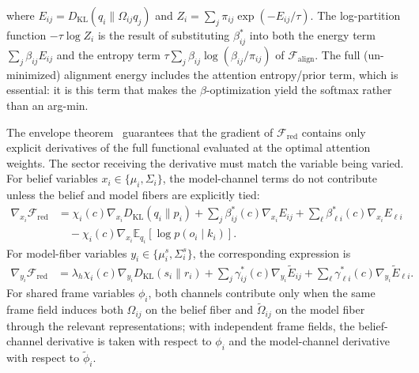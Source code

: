 \documentclass[11pt]{article}
\begin{document}
where $E_{ij} = D_{\mathrm{KL}}(q_i \| \Omega_{ij} q_j)$ and $Z_i = \sum_j \pi_{ij} \exp(-E_{ij}/\tau)$. The log-partition function $-\tau\log Z_i$ is the result of substituting $\beta_{ij}^*$ into both the energy term $\sum_j \beta_{ij} E_{ij}$ and the entropy term $\tau\sum_j \beta_{ij}\log(\beta_{ij}/\pi_{ij})$ of $\mathcal{F}_{\text{align}}$. The full (un-minimized) alignment energy includes the attention entropy/prior term, which is essential: it is this term that makes the $\beta$-optimization yield the softmax rather than an arg-min.

The envelope theorem~\cite{MilgromSegal2002} guarantees that the gradient of $\mathcal{F}_{\mathrm{red}}$ contains only explicit derivatives of the full functional evaluated at the optimal attention weights. The sector receiving the derivative must match the variable being varied. For belief variables $x_i \in \{\mu_i,\Sigma_i\}$, the model-channel terms do not contribute unless the belief and model fibers are explicitly tied:
\begin{equation}
\begin{aligned}
\nabla_{x_i}\mathcal{F}_{\mathrm{red}}
&= \chi_i(c)\nabla_{x_i}D_{\mathrm{KL}}(q_i\|p_i)
+ \sum_j \beta^*_{ij}(c)\nabla_{x_i}E_{ij}
+ \sum_\ell \beta^*_{\ell i}(c)\nabla_{x_i}E_{\ell i} \\
&\quad - \chi_i(c)\nabla_{x_i}\mathbb{E}_{q_i}[\log p(o_i\mid k_i)].
\end{aligned}
\label{eq:envelope_gradient_belief}
\end{equation}
For model-fiber variables $y_i \in \{\mu^s_i,\Sigma^s_i\}$, the corresponding expression is
\begin{equation}
\begin{aligned}
\nabla_{y_i}\mathcal{F}_{\mathrm{red}}
&= \lambda_h\chi_i(c)\nabla_{y_i}D_{\mathrm{KL}}(s_i\|r_i)
+ \sum_j \gamma^*_{ij}(c)\nabla_{y_i}\tilde E_{ij}
+ \sum_\ell \gamma^*_{\ell i}(c)\nabla_{y_i}\tilde E_{\ell i}.
\end{aligned}
\label{eq:envelope_gradient_model}
\end{equation}
For shared frame variables $\phi_i$, both channels contribute only when the same frame field induces both $\Omega_{ij}$ on the belief fiber and $\tilde{\Omega}_{ij}$ on the model fiber through the relevant representations; with independent frame fields, the belief-channel derivative is taken with respect to $\phi_i$ and the model-channel derivative with respect to $\tilde{\phi}_i$.
\end{document}
